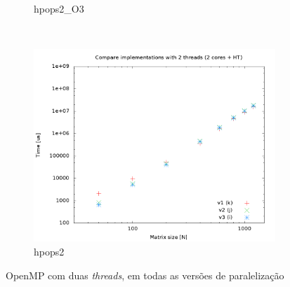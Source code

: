 \documentclass[a4paper, 12pt]{article}
\begin{document}
\begin{figure}[H]
\begin{subfigure}[H]{0.5\textwidth}
        \caption{hpops2\_O3}
        \label{fig:hpops2_O3_cmp_2t}
    \end{subfigure}
    ~ %
    \begin{subfigure}[H]{0.5\textwidth}
        \includegraphics[width=\textwidth]{hpops2_cmp_versions-2t}
        \caption{hpops2}
        \label{fig:hpops2_cmp_2t}
    \end{subfigure}%
    \caption{OpenMP com duas \textit{threads}, em todas as versões de paralelização}\label{fig:animals}
\end{figure}

\newpage
\end{document}
